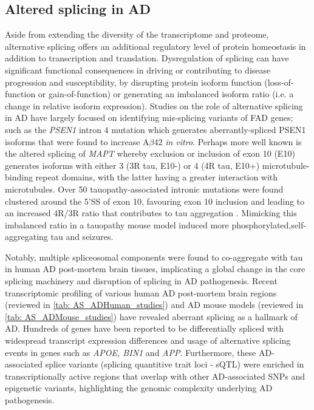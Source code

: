 \subsection{Altered splicing in AD}\label{intro:AD_alteredsplicing}
Aside from extending the diversity of the transcriptome and proteome, alternative splicing offers an additional regulatory level of protein homeostasis in addition to transcription and translation. Dysregulation of splicing can have significant functional consequences in driving or contributing to disease progression and susceptibility, by disrupting protein isoform function (loss-of-function or gain-of-function) or generating an imbalanced isoform ratio (i.e. a change in relative isoform expression). Studies on the role of alternative splicing in AD have largely focused on identifying mis-splicing variants of FAD genes; such as the \textit{PSEN1} intron 4 mutation which generates aberrantly-spliced PSEN1 isoforms that were found to increase A$\beta$42 \textit{in vitro}\cite{DeJonghe1999}. Perhaps more well known is the altered splicing of \textit{MAPT} whereby exclusion or inclusion of exon 10 (E10) generates isoforms with either 3 (3R tau, E10-) or 4 (4R tau, E10+) microtubule-binding repeat domains, with the latter having a greater interaction with microtubules. Over 50 tauopathy-associated intronic mutations were found clustered around the 5'SS of exon 10, favouring exon 10 inclusion \cite{DSouza1999, Ghetti2015} and leading to an increased 4R/3R ratio that contributes to tau aggregation \cite{Adams2010}. Mimicking this imbalanced ratio in a tauopathy mouse model induced more phosphorylated,self-aggregating tau and seizures\cite{Schoch2016}.  

Notably, multiple spliceosomal components were found to co-aggregate with tau in human AD post-mortem brain tissues\cite{Bai2013}, implicating a global change in the core splicing machinery and disruption of splicing in AD pathogenesis. Recent transcriptomic profiling of various human AD post-mortem brain regions (reviewed in \cref{tab: AS_ADHuman_studies}) and AD mouse models (reviewed in \cref{tab: AS_ADMouse_studies}) have revealed aberrant splicing as a hallmark of AD. Hundreds of genes have been reported to be differentially spliced with widespread transcript expression differences and usage of alternative splicing events in genes such as \textit{APOE, BIN1} and \textit{APP}\cite{Marques-Coelho2021, Raj2018}. Furthermore, these AD-associated splice variants (splicing quantitive trait loci - sQTL) were enriched in transcriptionally active regions that overlap with other AD-associated SNPs and epigenetic variants, highlighting the genomic complexity underlying AD pathogenesis.  

